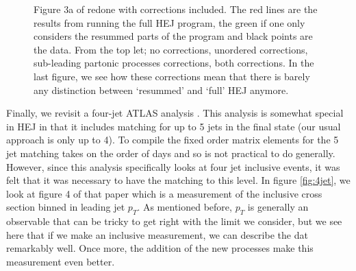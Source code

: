 \begin{figure}[t]
\caption{Figure 3a of \cite{Aad2014} redone with corrections included. The red lines are the results from running the full HEJ program, the green if one only considers the resummed parts of the program and black points are the data. From the top let; no corrections, unordered corrections, sub-leading partonic processes corrections, both corrections. In the last figure, we see how these corrections mean that there is barely any distinction between `resummed' and `full' HEJ anymore.}
\label{fig:newveto3a}
\end{figure}

Finally, we revisit a four-jet ATLAS analysis \cite{Aad2015}. This analysis is somewhat special in HEJ in that it includes matching for up to 5 jets in the final state (our usual approach is only up to 4). To compile the fixed order matrix elements for the 5 jet matching takes on the order of days and so is not practical to do generally. However, since this analysis specifically looks at four jet inclusive events, it was felt that it was necessary to have the matching to this level. In figure \ref{fig:4jet}, we look at figure 4 of that paper which is a measurement of the inclusive cross section binned in leading jet $p_T$. As mentioned before, $p_T$ is generally an observable that can be tricky to get right with the limit we consider, but we see here that if we make an inclusive measurement, we can describe the dat remarkably well. Once more, the addition of the new processes make this measurement even better. 

